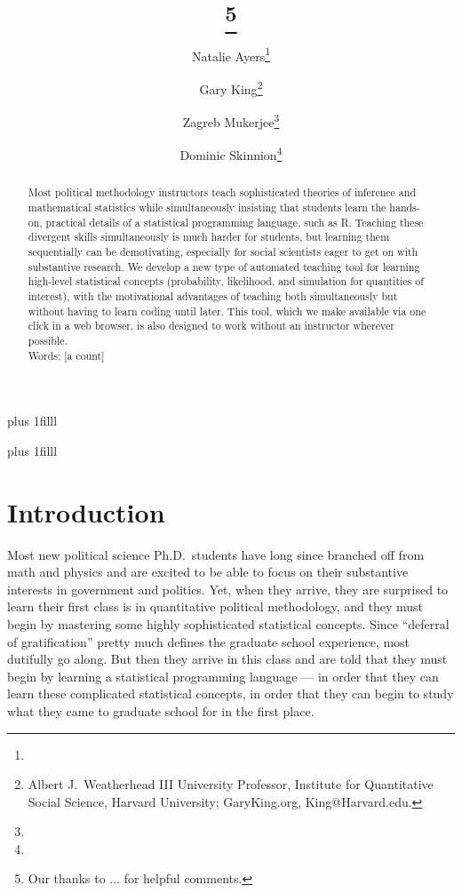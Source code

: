 \documentclass[12pt]{article}
\title{\titl}
\title{\titl\thanks{Our thanks to ... for helpful comments.}}
\author{Natalie Ayers\thanks{}\and Gary King\thanks{Albert J.\ Weatherhead
III University Professor, Institute for Quantitative Social
Science, Harvard University; GaryKing.org, King@Harvard.edu.}\and Zagreb Mukerjee\thanks{} \and Dominic Skinnion\thanks{}}
\newcommand{\btVFill}{\vskip0pt plus 1filll}
\theoremstyle{definition}
\begin{document}
\maketitle\thispagestyle{empty}\setcounter{page}{0}
\btVFill
\vspace{-2\baselineskip}
\begin{abstract}
  \noindent Most political methodology instructors teach sophisticated theories of inference and mathematical statistics while simultaneously insisting that students learn the hands-on, practical details of a statistical programming language, such as R. Teaching these divergent skills simultaneously is much harder for students, but learning them sequentially can be demotivating, especially for social scientists eager to get on with substantive research.  We develop a new type of automated teaching tool for learning high-level statistical concepts (probability, likelihood, and simulation for quantities of interest), with the motivational advantages of teaching both simultaneously but without having to learn coding until later. This tool, which we make available via one click in a web browser, is also designed to work without an instructor wherever possible.
  \\
  \newline
\noindent Words: [a count] 
\end{abstract}
\btVFill
\clearpage
{}\baselineskip

\section{Introduction}\label{s:intro}

Most new political science Ph.D.\ students have long since branched off from math and physics and are excited to be able to focus on their substantive interests in government and politics. Yet, when they arrive, they are surprised to learn their first class is in quantitative political methodology, and they must begin by mastering some highly sophisticated statistical concepts. Since ``deferral of gratification'' pretty much defines the graduate school experience, most dutifully go along. But then they arrive in this class and are told that they must begin by learning a statistical programming language --- in order that they can learn these complicated statistical concepts, in order that they can begin to study what they came to graduate school for in the first place.
\end{document}
